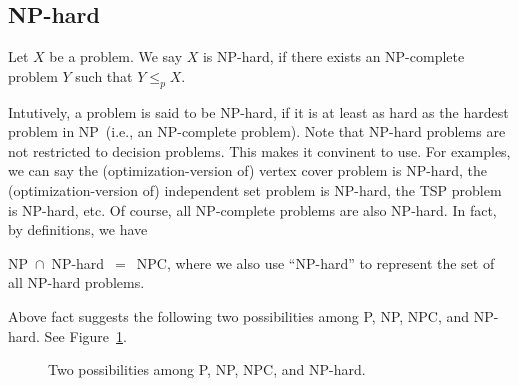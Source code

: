\subsection*{NP-hard}

\begin{definition}[NP-hard]
Let $X$ be a problem. We say $X$ is NP-hard, if there exists an NP-complete problem $Y$ such that $Y\le_p X$.
\end{definition}

Intutively, a problem is said to be NP-hard, if it is at least as hard as the hardest problem in NP~(i.e., an NP-complete problem).
Note that NP-hard problems are not restricted to decision problems. This makes it convinent to use. For examples, 
we can say the (optimization-version of) vertex cover problem is NP-hard,
the (optimization-version of) independent set problem is NP-hard,
the TSP problem is NP-hard, etc.
Of course, all NP-complete problems are also NP-hard. In fact, by definitions, we have

\begin{fact}
NP{}~$\cap${}~NP-hard{}~$=${}~NPC, where we also use ``NP-hard'' to represent the set of all NP-hard problems.
\end{fact}

Above fact suggests the following two possibilities among P, NP, NPC, and NP-hard. See Figure~\ref{fig:nphard}.

\begin{figure}[!h]
\centering{}
\vspace*{-0.1cm}
\caption{Two possibilities among P, NP, NPC, and NP-hard.}
\label{fig:nphard}
\end{figure}



